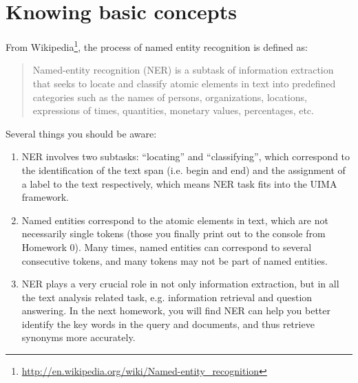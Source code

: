 
\section{Knowing basic concepts}

From
Wikipedia\footnote{\url{http://en.wikipedia.org/wiki/Named-entity_recognition}},
the process of named entity recognition is defined as:

\begin{quote}
Named-entity recognition (NER) is a subtask of information extraction that seeks
to locate and classify atomic elements in text into predefined categories such
as the names of persons, organizations, locations, expressions of times,
quantities, monetary values, percentages, etc.
\end{quote}

Several things you should be aware:

\begin{enumerate}

\item NER involves two subtasks: ``locating'' and ``classifying'', which
correspond to the identification of the text span (i.e. begin and end) and the
assignment of a label to the text respectively, which means NER task fits into
the UIMA framework.

\item Named entities correspond to the atomic elements in text, which are not
necessarily single tokens (those you finally print out to the console from
Homework 0). Many times, named entities can correspond to several consecutive
tokens, and many tokens may not be part of named entities.

\item NER plays a very crucial role in not only information extraction, but in
all the text analysis related task, e.g. information retrieval and question
answering. In the next homework, you will find NER can help you better identify
the key words in the query and documents, and thus retrieve synonyms more
accurately.
 
\end{enumerate}
